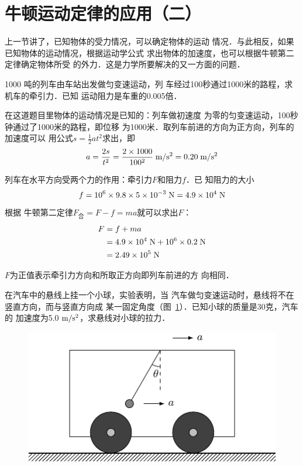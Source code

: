 \section{牛顿运动定律的应用（二）}
上一节讲了，已知物体的受力情况，可以确定物体的运动
情况．与此相反，如果已知物体的运动情况，根据运动学公式
求出物体的加速度，也可以根据牛顿第二定律确定物体所受
的外力．这是力学所要解决的又一方面的问题．

\begin{example}
1000 吨的列车由车站出发做匀变速运动，列
车经过100秒通过1000米的路程，求机车的牵引力．已知
运动阻力是车重的0.005倍．
\end{example}

\begin{solution}
在这道题目里物体的运动情况是已知的：列车做初速度
为零的匀变速运动，100秒钟通过了1000米的路程，即位移
为1000米．取列车前进的方向为正方向，列车的加速度可以
用公式$s=\frac{1}{2}at^2$求出，即
\[a=\frac{2s}{t^2}=\frac{2\times 1000}{100^2}\;\text{m}/\text{s}^2=0.20\;\text{m}/\text{s}^2 \]

    列车在水平方向受两个力的作用：牵引力$F$和阻力$f$．已
知阻力的大小
\[f=10^6\times 9.8\times 5\times 10^{-3} \;\text{N}=4.9\times 10^4 \;\text{N} \]
根据
牛顿第二定律$F_{\text{合}}=F-f=ma$就可以求出$F$：
\[\begin{split}
F&=f+ma\\
&=4.9\times 10^4 \;\text{N}+10^6\times 0.2 \;\text{N}\\
&=2.49\times 10^5\;\text{N}
\end{split} \]

$F$为正值表示牵引力方向和所取正方向即列车前进的方
向相同．
\end{solution}


\begin{example}
在汽车中的悬线上挂一个小球，实验表明，当
汽车做匀变速运动时，悬线将不在竖直方向，而与竖直方向成
某一固定角度（图~\ref{fig_A_3-10}）．已知小球的质量是30克，汽车的
加速度为5.0$\;\text{m}/\text{s}^2$，求悬线对小球的拉力．
\end{example}

\begin{figure}[htp]
    \centering
    \includegraphics{fig/A/3-10.pdf}
    \caption{}\label{fig_A_3-10}
\end{figure}

